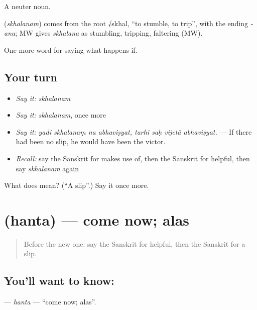 A neuter noun.

\begin{cousinweb}
\textbf{} (\emph{skhalanam}) comes from the root √skhal, \textquotedblleft{}to stumble, to trip\textquotedblright{}, with the ending \emph{-ana}; MW gives \emph{skhalana} as stumbling, tripping, faltering (MW).
\end{cousinweb}

\begin{grammarlens}[title={What you've built}]
One more word for saying what happens if.
\end{grammarlens}

\subsection*{Your turn}
\begin{itemize}
\raggedright
  \item \emph{Say it:} \emph{skhalanam}
  \item \emph{Say it:} \emph{skhalanam}, once more
  \item \emph{Say it:} \emph{yadi skhalanaṃ na abhaviṣyat, tarhi saḥ vijetā abhaviṣyat.} — If there had been no slip, he would have been the victor.
  \item \emph{Recall:} say the Sanskrit for makes use of, then the Sanskrit for helpful, then say \emph{skhalanam} again
\end{itemize}

\begin{tcolorbox}[breakable,colback=teal!4,colframe=teal!35!black,title={Before you move on}]
What does  mean? (\textquotedblleft{}A slip\textquotedblright{}.) Say it once more.
\end{tcolorbox}
\section[\texorpdfstring{\sk{हन्त} (hanta)}{हन्त (hanta)}]{ (hanta) — come now; alas}

\label{lesson:SA-C553-hanta}



\begin{quote}
Before the new one: say the Sanskrit for helpful, then the Sanskrit for a slip.
\end{quote}

\subsection*{You'll want to know: }
\textbf{} — \emph{hanta} — \textquotedblleft{}come now; alas\textquotedblright{}.

